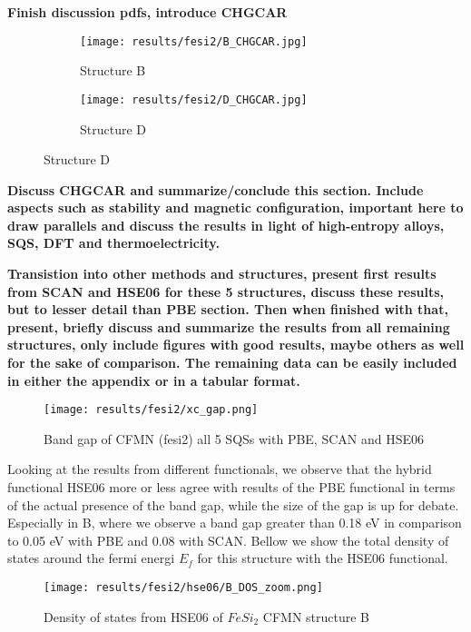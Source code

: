 \textbf{Finish discussion pdfs, introduce CHGCAR}

\begin{figure}
	\begin{subfigure}{\textwidth}
		\texttt{[image: results/fesi2/B\_CHGCAR.jpg]}
		\caption{Structure B}
	\end{subfigure}
	\hfill
	\begin{subfigure}{\textwidth}
		\texttt{[image: results/fesi2/D\_CHGCAR.jpg]}
		\caption{Structure D}
	\end{subfigure}
\end{figure}



\textbf{Discuss CHGCAR and summarize/conclude this section. Include aspects such as stability and magnetic configuration, important here to draw parallels and discuss the results in light of high-entropy alloys, SQS, DFT and thermoelectricity. }

\textbf{Transistion into other methods and structures, present first results from SCAN and HSE06 for these 5 structures, discuss these results, but to lesser detail than PBE section. Then when finished with that, present, briefly discuss and summarize the results from all remaining structures, only include figures with good results, maybe others as well for the sake of comparison. The remaining data can be easily included in either the appendix or in a tabular format. }

\begin{figure}[H]
\centering
\texttt{[image: results/fesi2/xc\_gap.png]}
\caption{Band gap of CFMN (fesi2) all 5 SQSs with PBE, SCAN and HSE06}
\label{Xc_fig}
\end{figure}


Looking at the results from different functionals, we observe that the hybrid functional HSE06 more or less agree with results of the PBE functional in terms of the actual presence of the band gap, while the size of the gap is up for debate. Especially in B, where we observe a band gap greater than 0.18 eV in comparison to 0.05 eV with PBE and 0.08 with SCAN. Bellow we show the total density of states around the fermi energi $E_f$ for this structure with the HSE06 functional. 

\begin{figure}[H]
\centering
\texttt{[image: results/fesi2/hse06/B\_DOS\_zoom.png]}
\caption{Density of states from HSE06 of $FeSi_2$ CFMN structure B}
\label{DOS_hse06_B}
\end{figure}

